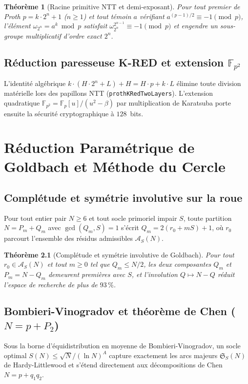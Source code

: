 \documentclass[11pt,a4paper,openany]{book}
\newtheorem{theoreme}{Théorème}[chapter]
\begin{document}
\begin{theoreme}[Racine primitive NTT et demi-exposant]
Pour tout premier de Proth $p = k \cdot 2^n + 1$ ($n \ge 1$) et tout témoin $a$ vérifiant $a^{(p-1)/2} \equiv -1 \pmod{p}$, l'élément $\omega_{2^n} = a^k \bmod p$ satisfait $\omega_{2^n}^{2^{n-1}} \equiv -1 \pmod{p}$ et engendre un sous-groupe multiplicatif d'ordre exact $2^n$.
\end{theoreme}

\section{Réduction paresseuse K-RED et extension $\mathbb{F}_{p^2}$}
L'identité algébrique $k \cdot (H \cdot 2^n + L) + H = H \cdot p + k \cdot L$ élimine toute division matérielle lors des papillons NTT (\texttt{prothKRedTwoLayers}). L'extension quadratique $\mathbb{F}_{p^2} = \mathbb{F}_p[u]/(u^2 - \beta)$ par multiplication de Karatsuba porte ensuite la sécurité cryptographique à $128$~bits.
\chapter{Réduction Paramétrique de Goldbach et Méthode du Cercle}

\section{Complétude et symétrie involutive sur la roue}
Pour tout entier pair $N \ge 6$ et tout socle primoriel impair $S$, toute partition $N = P_m + Q_m$ avec $\gcd(Q_m, S) = 1$ s'écrit $Q_m = 2(r_0 + mS) + 1$, où $r_0$ parcourt l'ensemble des résidus admissibles $\mathcal{A}_S(N)$.

\begin{theoreme}[Complétude et symétrie involutive de Goldbach]
Pour tout $r_0 \in \mathcal{A}_S(N)$ et tout $m \ge 0$ tel que $Q_m \le N/2$, les deux composantes $Q_m$ et $P_m = N - Q_m$ demeurent premières avec $S$, et l'involution $Q \mapsto N - Q$ réduit l'espace de recherche de plus de $93\,\%$.
\end{theoreme}

\section{Bombieri-Vinogradov et théorème de Chen ($N = p + P_2$)}
Sous la borne d'équidistribution en moyenne de Bombieri-Vinogradov, un socle optimal $S(N) \le \sqrt{N}/(\ln N)^A$ capture exactement les arcs majeurs $\mathfrak{S}_S(N)$ de Hardy-Littlewood et s'étend directement aux décompositions de Chen $N = p + q_1 q_2$.
\end{document}
